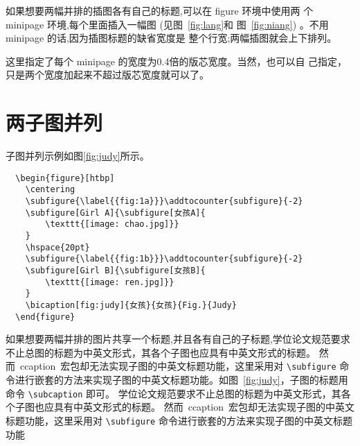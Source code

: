 如果想要两幅并排的插图各有自己的标题,可以在 figure 环境中使用两
个 minipage 环境,每个里面插入一幅图 (见图~\ref{fig:lang}和
图~\ref{fig:niang}) 。不用 minipage 的话,因为插图标题的缺省宽度是
整个行宽;两幅插图就会上下排列。

这里指定了每个 minipage 的宽度为0.4倍的版芯宽度。当然，也可以自
己指定，只是两个宽度加起来不超过版芯宽度就可以了。

\section{两子图并列}

子图并列示例如图\ref{fig:judy}所示。

\begin{figure}[htbp]
    \centering
    \addtocounter{subfigure}{-2}
    \hspace{20pt}
    \addtocounter{subfigure}{-2}
\end{figure}

\begin{lstlisting}
  \begin{figure}[htbp]
    \centering
    \subfigure{\label{{fig:1a}}}\addtocounter{subfigure}{-2}
    \subfigure[Girl A]{\subfigure[女孩A]{
        \texttt{[image: chao.jpg]}}
    }
    \hspace{20pt}
    \subfigure{\label{{fig:1b}}}\addtocounter{subfigure}{-2}
    \subfigure[Girl B]{\subfigure[女孩B]{
        \texttt{[image: ren.jpg]}}
    }
    \bicaption[fig:judy]{女孩}{女孩}{Fig.}{Judy}
  \end{figure}
\end{lstlisting}


如果想要两幅并排的图片共享一个标题,并且各有自己的子标题,学位论文规范要求不止总图的标题为中英文形式，其各个子图也应具有中英文形式的标题。
然而~ccaption~宏包却无法实现子图的中英文标题功能，这里采用对 \verb|\subfigure| 命令进行嵌套的方法来实现子图的中英文标题功能。如图~\ref{fig:judy}，子图的标题用命令 \verb|\subcaption| 即可。
学位论文规范要求不止总图的标题为中英文形式，其各个子图也应具有中英文形式的标题。
然而~ccaption~宏包却无法实现子图的中英文标题功能，这里采用对 \verb|\subfigure| 命令进行嵌套的方法来实现子图的中英文标题功能


